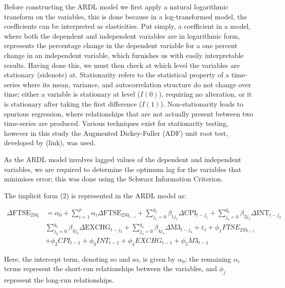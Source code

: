 \documentclass[12pt,a4paper]{article}
\begin{document}
Before constructing the ARDL model we first apply a natural logarithmic transform
on the variables, this is done because in a log-transformed model,
the coefficients can be interpreted as elasticities. Put simply, 
a coefficient in a model, where both the dependent and independent variables
are in logarithmic form, represents the percentage change in the 
dependent variable for a one percent change in an independent variable, 
which furnishes us with easily interpretable results. Having done this,
we must then check at which level the variables are stationary (sidenote) at.
Stationarity refers to the statistical property of a time-series where 
its mean, variance, and autocorrelation structure do not change over time; 
either a variable is stationary at level ($I(0)$), requiring no alteration,
or it is stationary after taking the first difference ($I(1)$). 
Non-stationarity leads to spurious regression, where relationships that 
are not actually present between two time-series are produced. Various
techniques exist for stationarity testing, however in this study the 
Augmented Dickey-Fuller (ADF) unit root test, developed by (link), was used. 

As the ARDL model involves lagged values of the dependent and independent 
variables, we are required to determine the optimum lag for the variables 
that minimises error; this was done using the Schwarz
Information Criterion.

The implicit form (2) is represented in the ARDL model as:

\begin{align*}
    \Delta \text{FTSE}_{250_t} &= \alpha_0 + \sum_{i=1}^{p} \alpha_i \Delta \text{FTSE}_{250_{t-i}} + \sum_{j_{1}=0}^{q_1} \beta_{1j_{1}} \Delta \text{CPI}_{t-j_{1}} + \sum_{j_{2}=0}^{q_2} \beta_{2j_{2}} \Delta \text{INT}_{t-j_{2}} \\
                               & \sum_{j_{3}=0}^{q_3} \beta_{3j_{3}} \Delta \text{EXCHG}_{t-j_{3}} + \sum_{j_{4}=0}^{q_4} \beta_{4j_{4}} \Delta \text{M3}_{t-j_{4}} + \varepsilon_t + \phi_{1} FTSE_{250_{t-1}} \\
                               & + \phi_{2} CPI_{t-1} + \phi_{3} INT_{t-1} +\phi_4 EXCHG_{t-1} + \phi_5 M3_{t-1}
\end{align*}

Here, the intercept term, denoting so and so, is given by $\alpha_0$; the 
remaining $\alpha_i$ terms represent the short-run relationships 
between the variables, and $\phi_j$ represent the long-run relationships. 
\end{document}
